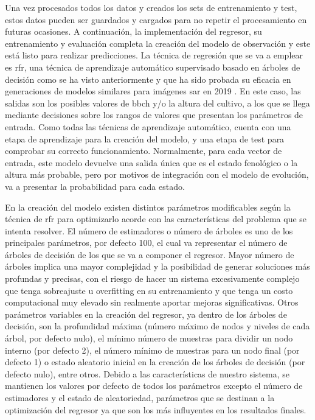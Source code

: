 \par Una vez procesados todos los datos y creados los sets de entrenamiento y test, estos datos pueden ser guardados y cargados para no repetir el procesamiento en futuras ocasiones. A continuación, la implementación del regresor, su entrenamiento y evaluación completa la creación del modelo de observación y este está listo para realizar predicciones. La técnica de regresión que se va a emplear es \gls{rfr}, una técnica de aprendizaje automático supervisado basado en árboles de decisión como se ha visto anteriormente y que ha sido probada su eficacia en generaciones de modelos similares para imágenes \gls{sar} en 2019 \cite{artRF}. En este caso, las salidas son los posibles valores de \gls{bbch} y/o la altura del cultivo, a los que se llega mediante decisiones sobre los rangos de valores que presentan los parámetros de entrada. Como todas las técnicas de aprendizaje automático, cuenta con una etapa de aprendizaje para la creación del modelo, y una etapa de test para comprobar su correcto funcionamiento. Normalmente, para cada vector de entrada, este modelo devuelve una salida única que es el estado fenológico o la altura más probable, pero por motivos de integración con el modelo de evolución, va a presentar la probabilidad para cada estado. 
\\
\par En la creación del modelo existen distintos parámetros modificables según la técnica de \gls{rfr} para optimizarlo acorde con las características del problema que se intenta resolver. El número de estimadores o número de árboles es uno de los principales parámetros, por defecto 100, el cual va representar el número de árboles de decisión de los que se va a componer el regresor. Mayor número de árboles implica una mayor complejidad y la posibilidad de generar soluciones más profundas y precisas, con el riesgo de hacer un sistema excesivamente complejo que tenga sobreajuste u overfitting en su entrenamiento y que tenga un costo computacional muy elevado sin realmente aportar mejoras significativas. Otros parámetros variables en la creación del regresor, ya dentro de los árboles de decisión, son la profundidad máxima (número máximo de nodos y niveles de cada árbol, por defecto nulo), el mínimo número de muestras para dividir un nodo interno (por defecto 2), el número mínimo de muestras para un nodo final (por defecto 1) o estado aleatorio inicial en la creación de los árboles de decisión (por defecto nulo), entre otros. Debido a las características de nuestro sistema, se mantienen los valores por defecto de todos los parámetros excepto el número de estimadores y el estado de aleatoriedad, parámetros que se destinan a la optimización del regresor ya que son los más influyentes en los resultados finales. 
